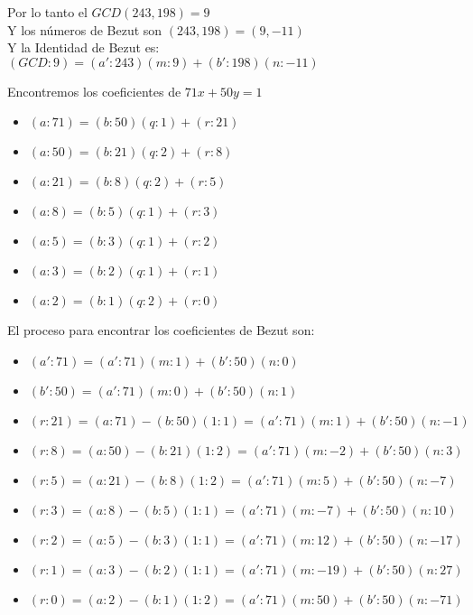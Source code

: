 \documentclass[12pt, fleqn]{article}                             %
\begin{document}
            Por lo tanto el $GCD(243, 198) = 9$\\
            Y los números de Bezut son $(243, 198) = (9, -11)$\\                       
            Y la Identidad de Bezut es: $(GCD:9) = (a':243)(m:9) +(b':198)(n:-11)$\\



            \clearpage


            Encontremos los coeficientes de $71x + 50y = 1$
            \begin{itemize}
                \item $(a:71) = (b:50)(q:1) + (r:21)$
                \item $(a:50) = (b:21)(q:2) + (r:8)$
                \item $(a:21) = (b:8)(q:2) + (r:5)$ 
                \item $(a:8) = (b:5)(q:1) + (r:3)$  
                \item $(a:5) = (b:3)(q:1) + (r:2)$   
                \item $(a:3) = (b:2)(q:1) + (r:1)$   
                \item $(a:2) = (b:1)(q:2) + (r:0)$  
            \end{itemize}

            El proceso para encontrar los coeficientes de Bezut son:

            \begin{itemize}
                \item $(a':71) = (a':71)(m:1) + (b':50)(n:0)$
                \item $(b':50) = (a':71)(m:0) + (b':50)(n:1)$    
            \end{itemize}

            \begin{itemize}
                \item $(r:21) = (a:71) - (b:50)(1:1)  =  (a':71)(m:1) + (b':50)(n:-1)$
                \item $(r:8) = (a:50) - (b:21)(1:2)  =  (a':71)(m:-2) + (b':50)(n:3) $
                \item $(r:5) = (a:21) - (b:8)(1:2)  =  (a':71)(m:5) + (b':50)(n:-7)  $
                \item $(r:3) = (a:8) - (b:5)(1:1)  =  (a':71)(m:-7) + (b':50)(n:10)  $
                \item $(r:2) = (a:5) - (b:3)(1:1)  =  (a':71)(m:12) + (b':50)(n:-17) $
                \item $(r:1) = (a:3) - (b:2)(1:1)  =  (a':71)(m:-19) + (b':50)(n:27) $
                \item $(r:0) = (a:2) - (b:1)(1:2)  =  (a':71)(m:50) + (b':50)(n:-71) $ 
            \end{itemize}
\end{document}
